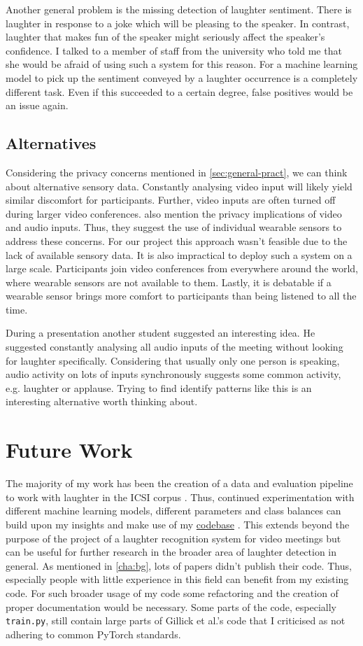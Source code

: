 \documentclass[bsc,frontabs,parskip,deptreport]{infthesis}
\newcommand{\coderepo}{\href{https://github.com/LasseWolter/laughter-detection-icsi}{codebase} }
\begin{document}
Another general problem is the missing detection of laughter sentiment. There is laughter in response to a joke which will be pleasing to the speaker. In contrast, laughter that makes fun of the speaker might seriously affect the speaker's confidence. I talked to a member of staff from the university who told me that she would be afraid of using such a system for this reason. 
For a machine learning model to pick up the sentiment conveyed by a laughter occurrence is a completely different task. Even if this succeeded to a certain degree, false positives would be an issue again. 


\section{Alternatives}
Considering the privacy concerns mentioned in \autoref{sec:general-pract}, we can think about alternative sensory data. 
Constantly analysing video input will likely yield similar discomfort for participants. Further, video inputs are often turned off during larger video conferences.
\citet{cosentino2016quantitative}  also mention the privacy implications of video and audio inputs.
Thus, they suggest the use of individual wearable sensors to address these concerns. For our project this approach wasn't feasible due to the lack of available sensory data.
It is also impractical to deploy such a system on a large scale. Participants join video conferences from everywhere around the world, where wearable sensors are not available to them. Lastly, it is debatable if a wearable sensor brings more comfort to participants than being listened to all the time. 

During a presentation another student suggested an interesting idea. He suggested constantly analysing all audio inputs of the meeting without looking for laughter specifically. Considering that usually only one person is speaking, audio activity on lots of inputs synchronously suggests some common activity, e.g. laughter or applause. Trying to find identify patterns like this is an interesting alternative worth thinking about. 

\chapter{Future Work}
The majority of my work has been the creation of a data and evaluation pipeline to work with laughter in the ICSI corpus \citep{morgan2001meeting}. 
Thus, continued experimentation with different machine learning models, different parameters and class balances can build upon my insights and make use of my \coderepo.
This extends beyond the purpose of the project of a laughter recognition system for video meetings but can be useful for further research in the broader area of laughter detection in general. 
As mentioned in \autoref{cha:bg}, lots of papers didn't publish their code.
Thus, especially people with little experience in this field can benefit from my existing code. 
For such broader usage of my code some refactoring and the creation of proper documentation would be necessary.
Some parts of the code, especially \verb|train.py|, still contain large parts of Gillick et al.'s code that I criticised as not adhering to common PyTorch standards. 
\end{document}
